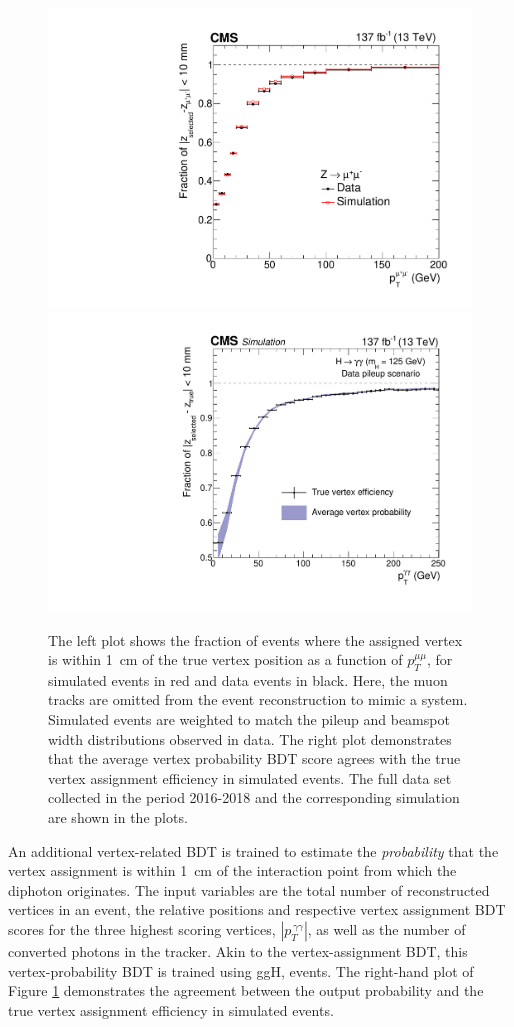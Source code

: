 \begin{figure}[htb!]
  \centering
  \includegraphics[width=.49\textwidth]{Figures/hgg_overview/Zmumu_eff_vs_pt_All.pdf}
  \includegraphics[width=.49\textwidth]{Figures/hgg_overview/AverageProbPlotFullRunIIVersusPt.pdf}
  \caption[Vertex-assignment and vertex-probability BDT]
  {
    The left plot shows the fraction of \Zmumu events where the assigned vertex is within 1~cm of the true vertex position as a function of $p_T^{\mu\mu}$, for simulated events in red and data events in black. Here, the muon tracks are omitted from the event reconstruction to mimic a \Hgg system. Simulated events are weighted to match the pileup and beamspot width distributions observed in data. The right plot demonstrates that the average vertex probability BDT score agrees with the true vertex assignment efficiency in simulated events. The full data set collected in the period 2016-2018 and the corresponding simulation are shown in the plots.
  }
  \label{fig:vertex_selection_0}
\end{figure}

An additional vertex-related BDT is trained to estimate the \textit{probability} that the vertex assignment is within 1~cm of the interaction point from which the diphoton originates. The input variables are the total number of reconstructed vertices in an event, the relative positions and respective vertex assignment BDT scores for the three highest scoring vertices, $|{p}_T^{\,\gamma\gamma}|$, as well as the number of converted photons in the tracker. Akin to the vertex-assignment BDT, this vertex-probability BDT is trained using ggH, \Hgg events. The right-hand plot of Figure \ref{fig:vertex_selection_0} demonstrates the agreement between the output probability and the true vertex assignment efficiency in simulated events.

